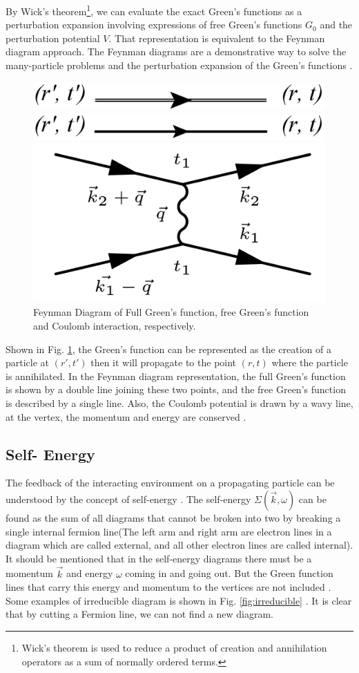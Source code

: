 By Wick's theorem\footnote{Wick's theorem is used to reduce a product of creation and annihilation operators as a sum of normally ordered terms.}, we can evaluate the exact Green's functions as a perturbation expansion involving expressions of free Green's functions $ G_{0}$ and the perturbation potential $ V$. That representation is equivalent to the Feynman diagram approach. The Feynman diagrams are a demonstrative way to solve the many-particle problems and the perturbation expansion of the Green's functions \cite{Andre, wick, WESTWANSKI}.


\begin{figure}[ht]
\centering
    \includegraphics[width=0.40\linewidth]{fig2/full_green.pdf} 
    
    
    \includegraphics[width=0.40\linewidth]{fig2/free_green.pdf}
    
    
    \includegraphics[width=0.30\linewidth]{fig2/po.png}
\caption{Feynman Diagram of Full Green's function, free Green's function and Coulomb interaction, respectively. 
\label{fig:green_diagram}}
\end{figure}

Shown in Fig. \ref{fig:green_diagram}, the Green's function can be represented as the creation of a particle at $(r', t')$ then it will propagate to the point $(r, t)$ where the particle is annihilated. In the Feynman diagram representation, the full Green's function is shown by a double line joining these two points, and the free Green's function is described by a single line. Also, the Coulomb potential is drawn by a wavy line, at the vertex, the momentum and energy are conserved \cite{Sam, Strohm}.

\subsection{Self- Energy}


The feedback of the interacting environment on a propagating particle can be understood by the concept of self-energy \cite{Piers}. The self-energy $\Sigma(\overrightarrow{k},\omega)$ can be found as the sum of all diagrams that cannot be broken into two by breaking a single internal fermion line(The left arm and right arm are electron lines in a diagram which are called external, and all other electron lines are called internal). It should be mentioned that in the self-energy diagrams there must be a momentum $\overrightarrow{k}$ and energy $\omega$ coming in and going out. But the Green function lines that carry this energy and momentum to the vertices are not included \cite{Sam, Richard}. Some examples of irreducible diagram is shown in Fig. \ref{fig:irreducible} \cite{Richard}. It is clear that by cutting a Fermion line, we can not find a new diagram.
 
